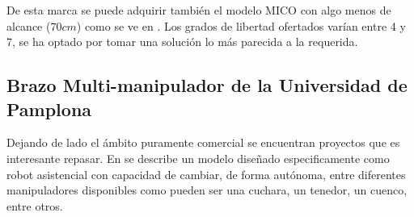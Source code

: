 	  De esta marca se puede adquirir también el modelo MICO con algo menos de alcance ($70cm$) como se ve en \cite{Mico:2018}. Los grados de libertad ofertados varían entre 4 y 7, se ha optado por tomar una solución lo más parecida a la requerida.

 \subsection{Brazo Multi-manipulador de la Universidad de Pamplona}

    Dejando de lado el ámbito puramente comercial se encuentran proyectos que es interesante repasar. En \cite{Marquez:2013} se describe un modelo diseñado especificamente como robot asistencial con capacidad de cambiar, de forma autónoma, entre diferentes manipuladores disponibles como pueden ser una cuchara, un tenedor, un cuenco, entre otros.
    \\

